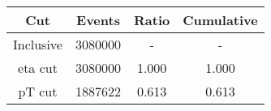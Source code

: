 \begin{tabular}{|c||c|c|c|}
\hline
Cut & Events & Ratio & Cumulative \\\hline
Inclusive & 3080000 & - & - \\
eta cut & 3080000 & 1.000 & 1.000 \\
pT cut & 1887622 & 0.613 & 0.613 \\
\end{tabular}